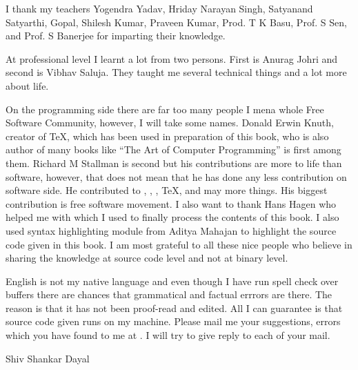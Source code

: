 I thank my teachers Yogendra Yadav, Hriday Narayan Singh, Satyanand
Satyarthi, Gopal, Shilesh Kumar, Praveen Kumar, Prod. T K Basu, Prof. S
Sen, and Prof. S Banerjee for imparting their knowledge.

At professional level I learnt a lot from two persons. First is Anurag
Johri and second is Vibhav Saluja. They taught me several technical
things and a lot more about life.

On the programming side there are far too many people I mena whole
Free Software Community, however, I will take some names. Donald Erwin
Knuth, creator of \TeX{}, which has been used in preparation of this
book, who is also author of many books like ``The Art of Computer
Programming'' is first among them. Richard M Stallman is second but
his contributions are more to life than software, however, that does
not mean that he has done any less contribution on software side. He
contributed to , , , \TeX{},
 and may more things. His biggest contribution is free
software movement. I also want to thank Hans Hagen who helped me with
\ConTeXt{} which I used to finally process the contents of this book.
I also used  syntax highlighting module from Aditya Mahajan
to highlight the source code given in this book. I am most grateful to
all these nice people who believe in sharing the knowledge at source
code level and not at binary level.

English is not my native language and even though I have run spell
check over buffers there are chances that grammatical and factual
errrors are there. The reason is that it has not been proof-read and
edited. All I can guarantee is that source code given runs on my
machine. Please mail me your suggestions, errors which you have found
to me at \from[email]. I will try to give
reply to each of your mail.

\startalignment[flushright]
Shiv Shankar Dayal
\stopalignment


